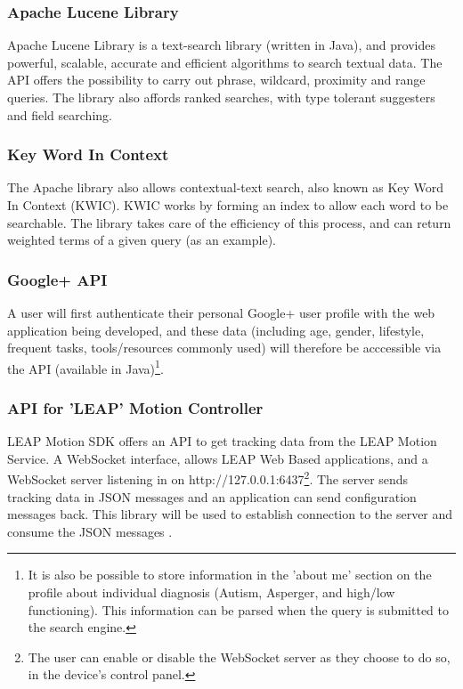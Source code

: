 \documentclass[a4paper, 10pt]{article}
\begin{document}
\subsubsection{Apache Lucene Library}\label{apache}
Apache Lucene Library is a text-search library (written in Java), and provides powerful, scalable, accurate and efficient algorithms to search textual data. The API offers the possibility to carry out phrase, wildcard, proximity and range queries. The library also affords ranked searches, with type tolerant suggesters and field searching.

\subsubsection{Key Word In Context} \label{KWIC} 
The Apache library also allows contextual-text search, also known as Key Word In Context (KWIC)\cite{kwic}. KWIC works by forming an index to allow each word to be searchable. The library takes care of the efficiency of this process, and can return weighted terms of a given query (as an example).


\subsubsection{Google+ API}
A user will first authenticate their personal Google+ user profile with the web application being developed, and these data (including age, gender, lifestyle, frequent tasks, tools/resources commonly used) will therefore be acccessible via the API (available in Java)\footnote{It is also be possible to store information in the 'about me' section on the profile about individual diagnosis (Autism, Asperger, and high/low functioning). This information can be parsed when the query is submitted to the search engine.}. 

\subsubsection{API for 'LEAP' Motion Controller}
LEAP Motion SDK offers an API to get tracking data from the LEAP Motion Service. A WebSocket interface, allows LEAP Web Based applications, and a WebSocket server listening in on http://127.0.0.1:6437\footnote{The user can enable or disable the WebSocket server as they choose to do so, in the device's control panel.}.
The server sends tracking data in JSON messages and an application can send configuration messages back. This library will be used to establish connection to the server and consume the JSON messages \cite{leap}. 
\end{document}
